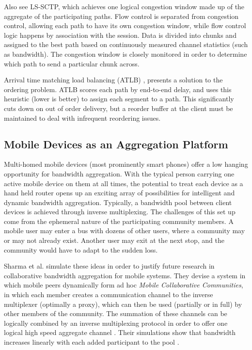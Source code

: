 \documentclass[12pt]{article}
\begin{document}
	Also see LS-SCTP, which achieves one logical congestion window made up of the aggregate of the participating paths. Flow control is separated from congestion control, allowing each path to have its own congestion window, while flow control logic happens by association with the session. Data is divided into chunks and assigned to the best path based on continuously measured channel statistics (such as bandwidth). The congestion window is closely monitored in order to determine which path to send a particular chunk across\cite{AbdElAl20041012}.

	Arrival time matching load balancing (ATLB) \cite{iguchi2005new}, presents a solution to the ordering problem. ATLB scores each path by end-to-end delay, and uses this heuristic (lower is better) to assign each segment to a path. This significantly cuts down on out of order delivery, but a reorder buffer at the client must be maintained to deal with infrequent reordering issues.

\subsection{Mobile Devices as an Aggregation Platform}

	Multi-homed mobile devices (most prominently smart phones) offer a low hanging opportunity for bandwidth aggregation. With the typical person carrying one active mobile device on them at all times, the potential to treat each device as a hand held router opens up an exciting array of possibilities for intelligent and dynamic bandwidth aggregation. Typically, a bandwidth pool between client devices is achieved through inverse multiplexing. The challenges of this set up come from the ephemeral nature of the participating community members. A mobile user may enter a bus with dozens of other users, where a community may or may not already exist. Another user may exit at the next stop, and the community would have to adapt to the sudden loss.

	Sharma et al. simulate these ideas in order to justify future research in collaborative bandwidth aggregation for mobile systems. They devise a system in which mobile peers dynamically form ad hoc {\it Mobile Collaborative Communities}, in which each member creates a communication channel to the inverse multiplexer (optimally a proxy), which can then be used (partially or in full) by other members of the community. The summation of these channels can be logically combined by an inverse multiplexing protocol in order to offer one logical high speed aggregate channel \cite{1363842}. Their simulations show that bandwidth increases linearly with each added participant to the pool \cite{1363842}.
\end{document}
